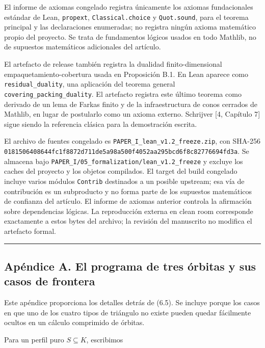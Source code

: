 \documentclass[
  spanish,
  11pt,
  a4paper,
]{article}
\begin{document}
El informe de axiomas congelado registra únicamente los axiomas fundacionales estándar de Lean, \texttt{propext}, \texttt{Classical.choice} y \texttt{Quot.sound}, para el teorema principal y las declaraciones enumeradas; no registra ningún axioma matemático propio del proyecto. Se trata de fundamentos lógicos usados en todo Mathlib, no de supuestos matemáticos adicionales del artículo.

El artefacto de release también registra la dualidad finito-dimensional empaquetamiento-cobertura usada en Proposición B.1. En Lean aparece como \texttt{residual\_duality}, una aplicación del teorema general \texttt{covering\_packing\_duality}. El artefacto registra este último teorema como derivado de un lema de Farkas finito y de la infraestructura de conos cerrados de Mathlib, en lugar de postularlo como un axioma externo. Schrijver {[}4, Capítulo 7{]} sigue siendo la referencia clásica para la demostración escrita.

El archivo de fuentes congelado es \texttt{PAPER\_I\_lean\_v1.2\_freeze.zip}, con SHA-256 \texttt{0181506408644fc1f8872d711de5a98a500f4052aa295bcd6f8c82776694fd3a}. Se almacena bajo \texttt{PAPER\_I/05\_formalization/lean\_v1.2\_freeze} y excluye los caches del proyecto y los objetos compilados. El target del build congelado incluye varios módulos \texttt{Contrib} destinados a un posible upstream; esa vía de contribución es un subproducto y no forma parte de los supuestos matemáticos de confianza del artículo. El informe de axiomas anterior controla la afirmación sobre dependencias lógicas. La reproducción externa en clean room corresponde exactamente a estos bytes del archivo; la revisión del manuscrito no modifica el artefacto formal.

\begin{center}\rule{0.5\linewidth}{0.5pt}\end{center}

\subsection{Apéndice A. El programa de tres órbitas y sus casos de frontera}\label{apuxe9ndice-a.-el-programa-de-tres-uxf3rbitas-y-sus-casos-de-frontera}

Este apéndice proporciona los detalles detrás de (6.5). Se incluye porque los casos en que uno de los cuatro tipos de triángulo no existe pueden quedar fácilmente ocultos en un cálculo comprimido de órbitas.

Para un perfil puro \(S\subseteq K\), escribimos
\end{document}
